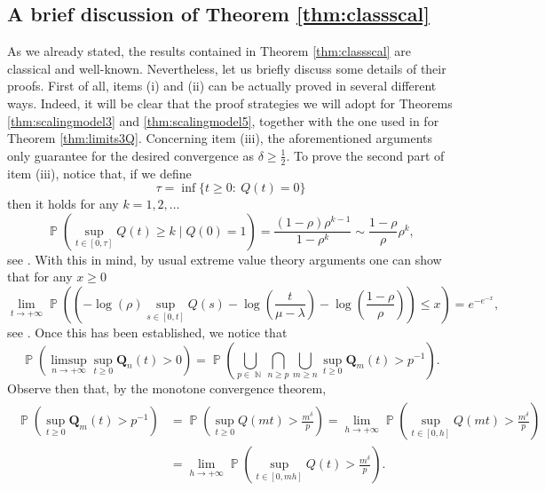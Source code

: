 \documentclass[]{amsart}
\numberwithin{equation}{section}
\theoremstyle{remark}
\theoremstyle{definition}
\DeclareMathOperator{\N}{\mathbb{N}}
\DeclareMathOperator{\bP}{\mathbb{P}}
\begin{document}
\subsection{A brief discussion of Theorem \ref{thm:classscal}}\label{sec:MM1proof}
As we already stated, the results contained in Theorem \ref{thm:classscal} are classical and well-known. Nevertheless, let us briefly discuss some details of their proofs. First of all, items (i) and (ii) can be actually proved in several different ways. Indeed, it will be clear that the proof strategies we will adopt for Theorems \ref{thm:scalingmodel3} and \ref{thm:scalingmodel5}, together with the one used in \cite{butt2023queuing} for Theorem \ref{thm:limits3Q}. Concerning item (iii), the aforementioned arguments only guarantee for the desired convergence as $\delta\ge \frac{1}{2}$. To prove the second part of item (iii), notice that, if we define
\begin{equation*}
	\tau=\inf\{t \ge 0: \ Q(t)=0\}
\end{equation*}
then it holds for any $k=1,2,\dots$
\begin{equation*}
	\bP(\sup_{t \in [0,\tau]}Q(t) \ge k\mid Q(0)=1)=\frac{(1-\rho)\rho^{k-1}}{1-\rho^{k}} \sim \frac{1-\rho}{\rho}\rho^{k},
\end{equation*}
see \cite[Proposition 3.1]{asmussen1998extreme}. With this in mind, by usual extreme value theory arguments one can show that for any $x \ge 0$
\begin{equation}\label{eq:Gumbel}
	\lim_{t \to +\infty}\bP\left(\left(-\log(\rho)\sup_{s \in [0,t]}Q(s)-\log\left(\frac{ t}{\mu-\lambda}\right)-\log\left(\frac{1-\rho}{\rho}\right)\right) \le x\right)=e^{-e^{-x}},
\end{equation}
see \cite[Example 1.1]{asmussen1998extreme}.
Once this has been established, we notice that
\begin{equation*}
	\bP\left(\limsup_{n \to +\infty}\sup_{t \ge 0}\mathbf{Q}_n(t)>0\right)=\bP\left(\bigcup_{p \in \N}\bigcap_{n \ge p}\bigcup_{m \ge n}\sup_{t \ge 0}\mathbf{Q}_m(t)>p^{-1}\right).
\end{equation*}
Observe then that, by the monotone convergence theorem,
\begin{align}\label{eq:limitrep}
	\begin{split}
	\bP\left(\sup_{t \ge 0}\mathbf{Q}_m(t)>p^{-1}\right)&=\bP\left(\sup_{t \ge 0}Q(mt)>\frac{m^{\delta}}{p}\right)=\lim_{h \to +\infty}\bP\left(\sup_{t \in [0,h]}Q(mt)>\frac{m^{\delta}}{p}\right)\\
	&=\lim_{h \to +\infty}\bP\left(\sup_{t \in [0,mh]}Q(t)>\frac{m^{\delta}}{p}\right).		
	\end{split}
\end{align}
\end{document}
